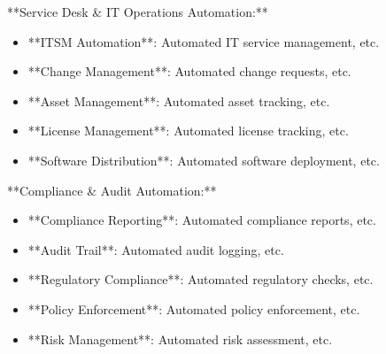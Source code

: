 \documentclass[11pt,a4paper]{article}
\begin{document}
**Service Desk \& IT Operations Automation:**

\begin{itemize}
\item **ITSM Automation**: Automated IT service management, etc.
\end{itemize}

\begin{itemize}
\item **Change Management**: Automated change requests, etc.
\end{itemize}

\begin{itemize}
\item **Asset Management**: Automated asset tracking, etc.
\end{itemize}

\begin{itemize}
\item **License Management**: Automated license tracking, etc.
\end{itemize}

\begin{itemize}
\item **Software Distribution**: Automated software deployment, etc.
\end{itemize}

**Compliance \& Audit Automation:**

\begin{itemize}
\item **Compliance Reporting**: Automated compliance reports, etc.
\end{itemize}

\begin{itemize}
\item **Audit Trail**: Automated audit logging, etc.
\end{itemize}

\begin{itemize}
\item **Regulatory Compliance**: Automated regulatory checks, etc.
\end{itemize}

\begin{itemize}
\item **Policy Enforcement**: Automated policy enforcement, etc.
\end{itemize}

\begin{itemize}
\item **Risk Management**: Automated risk assessment, etc.
\end{itemize}
\end{document}
